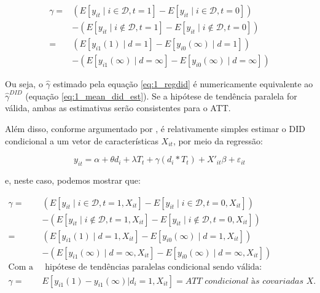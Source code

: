 \documentclass[portugues]{article}
\begin{document}
\[
\begin{split}
\gamma = & \left(E\left[y_{it} \mid i \in \mathcal{D}, t=1 \right]-E\left[y_{it} \mid i \in \mathcal{D}, t=0\right]\right) \\
        & -\left(E\left[y_{it} \mid i \not\in \mathcal{D}, t=1 \right]-E\left[y_{it} \mid i \not\in \mathcal{D}, t=0\right]\right) \\
       = & \left(E\left[y_{i1}(1) \mid d = 1 \right]-E\left[y_{i0}(\infty) \mid d = 1 \right]\right) \\
        & -\left(E\left[y_{i1}(\infty) \mid d = \infty \right]-E\left[y_{i0}(\infty) \mid d = \infty \right]\right) 
    \end{split}
\]

Ou seja, o $\hat{\gamma}$ estimado pela equação \eqref{eq:1_regdid} é numericamente equivalente ao $\hat{\gamma}^{DID}$ (equação \eqref{eq:1_mean_did_est}). Se a hipótese de tendência paralela for válida, ambas as estimativas serão consistentes para o ATT. 

Além disso, conforme argumentado por \cite{angrist2009mostly}, é relativamente simples estimar o DID condicional a um vetor de características $X_{it}$, por meio da regressão:

\begin{equation}\label{eq:1_regdid_wx}
    y_{it} = \alpha + \theta d_i + \lambda T_t + \gamma (d_i*T_t) +  X'_{it} \beta + \varepsilon_{it}
\end{equation}

e, neste caso, podemos mostrar que:

\[
\begin{split}
    \gamma = &  \left(E\left[y_{it} \mid i \in \mathcal{D}, t=1, X_{it} \right]-E\left[y_{it} \mid i \in \mathcal{D}, t=0, X_{it}\right]\right) \\
        & -\left(E\left[y_{it} \mid i \not\in \mathcal{D}, t=1 , X_{it}\right]-E\left[y_{it} \mid i \not\in \mathcal{D}, t=0, X_{it}\right]\right) \\
       = & \left(E\left[y_{i1}(1) \mid d = 1, X_{it} \right]-E\left[y_{i0}(\infty) \mid d = 1, X_{it} \right]\right) \\
        & -\left(E\left[y_{i1}(\infty) \mid d = \infty, X_{it} \right]-E\left[y_{i0}(\infty) \mid d = \infty, X_{it} \right]\right) \\
    \text{Com a } & \text{ hipótese de tendências paralelas condicional sendo válida:} \\   
   \gamma =   & E[y_{i1}(1) - y_{i1}(\infty) | d_i = 1, X_{it}] = ATT \textit{ condicional às covariadas $X$}.
\end{split}
\]
\end{document}
